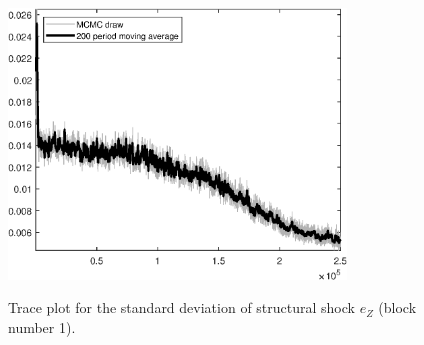 \begin{figure}[H]
\centering
  \includegraphics[width=0.8\textwidth]{BRS_est_shopping/graphs/TracePlot_SE_e_Z_blck_1}\\
    \caption{Trace plot for the standard deviation of structural shock ${e_Z}$ (block number 1).}
\end{figure}
